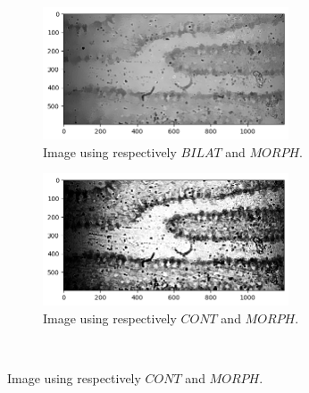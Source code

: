 \begin{figure}[h!]
     \begin{subfigure}[b]{0.5\textwidth}
        \centering
        \includegraphics[width=0.8\textwidth]{afbeeldingen/rank/img_morph_bilat.png}
        \caption{Image using respectively $BILAT$ and $MORPH$.}
        \label{fig_rank_morph_bilat}
    \end{subfigure}
    \begin{subfigure}[b]{0.5\textwidth}
        \centering
        \includegraphics[width=0.8\textwidth]{afbeeldingen/rank/img_morph_cont.png}
        \caption{Image using respectively $CONT$ and  $MORPH$.}
        \label{fig_rank_morph_cont}
    \end{subfigure}
\\


\end{figure}
